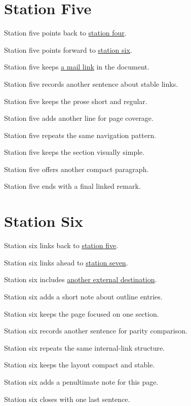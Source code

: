 \documentclass{article}
\begin{document}
\section{Station Five}
\label{sec:station-five}
Station five points back to \hyperref[sec:station-four]{station four}.\par
Station five points forward to \hyperref[sec:station-six]{station six}.\par
Station five keeps \href{mailto:bench@example.net}{a mail link} in the document.\par
Station five records another sentence about stable links.\par
Station five keeps the prose short and regular.\par
Station five adds another line for page coverage.\par
Station five repeats the same navigation pattern.\par
Station five keeps the section visually simple.\par
Station five offers another compact paragraph.\par
Station five ends with a final linked remark.\par
\newpage

\section{Station Six}
\label{sec:station-six}
Station six links back to \hyperref[sec:station-five]{station five}.\par
Station six links ahead to \hyperref[sec:station-seven]{station seven}.\par
Station six includes \href{https://example.com/six}{another external destination}.\par
Station six adds a short note about outline entries.\par
Station six keeps the page focused on one section.\par
Station six records another sentence for parity comparison.\par
Station six repeats the same internal-link structure.\par
Station six keeps the layout compact and stable.\par
Station six adds a penultimate note for this page.\par
Station six closes with one last sentence.\par
\newpage
\end{document}
